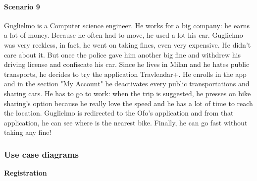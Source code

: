 \documentclass[12pt,titlepage]{article}
\begin{document}
\paragraph{Scenario 9}
Guglielmo is a Computer science engineer. He works for a big company: he earns a lot of money. Because he often had to move, he used a lot his car. Guglielmo was very reckless, in fact, he went on taking fines, even very expensive. He didn't care about it. But once the police gave him another big fine and withdrew his driving license and confiscate his car.
Since he lives in Milan and he hates public transports, he decides to try the application Travlendar+. He enrolls in the app and in the section "My Account" he deactivates every public transportations and sharing cars. He has to go to work: when the trip is suggested, he presses on bike sharing's option because he really love the speed and he has a lot of time to reach the location. Guglielmo is redirected to the Ofo's application and from that application, he can see where is the nearest bike. Finally, he can go fast without taking any fine!




\pagebreak
\subsubsection{Use case diagrams}\label{sec:mod1}
\begin{flushleft}
\textbf{Registration} 
\end{flushleft}
\end{document}
